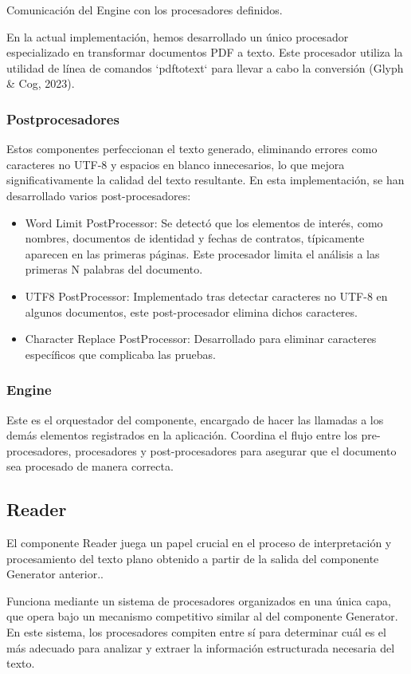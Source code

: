 Comunicación del Engine con los procesadores definidos.

En la actual implementación, hemos desarrollado un único procesador especializado en transformar documentos PDF a
texto. Este procesador utiliza la utilidad de línea de comandos `pdftotext` para llevar a cabo la conversión (Glyph \& Cog, 2023).

\subsubsection*{Postprocesadores}
Estos componentes perfeccionan el texto generado, eliminando errores como caracteres no UTF-8 y espacios en blanco innecesarios, lo que mejora significativamente la calidad del texto resultante. En esta implementación, se han desarrollado varios post-procesadores:

\begin{itemize}
    \item Word Limit PostProcessor: Se detectó que los elementos de interés, como nombres, documentos de identidad y fechas de contratos, típicamente aparecen en las primeras páginas. Este procesador limita el análisis a las primeras N palabras del documento.
    \item UTF8 PostProcessor: Implementado tras detectar caracteres no UTF-8 en algunos documentos, este post-procesador elimina dichos caracteres.
    \item Character Replace PostProcessor: Desarrollado para eliminar caracteres específicos que complicaba las pruebas.
\end{itemize}

\subsubsection*{Engine}
Este es el orquestador del componente, encargado de hacer las llamadas a los demás elementos registrados en la aplicación. Coordina el flujo entre los pre-procesadores, procesadores y post-procesadores para asegurar que el documento sea procesado de manera correcta.

\subsection*{Reader}
El componente Reader juega un papel crucial en el proceso de interpretación y procesamiento del texto plano obtenido a partir de la salida del componente Generator anterior..

Funciona mediante un sistema de procesadores organizados en una única capa, que opera bajo un mecanismo competitivo similar al del componente Generator. En este sistema, los procesadores compiten entre sí para determinar cuál es el más adecuado para analizar y extraer la información estructurada necesaria del texto.

